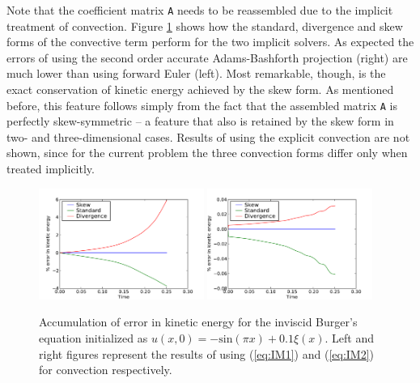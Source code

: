 Note that the coefficient matrix {\fontsize{12pt}{12pt}\texttt{A}} needs to be reassembled due to the
implicit treatment of convection. Figure \ref{fig:burgers_KE} shows
how the standard, divergence and skew forms of the convective term
perform for the two implicit solvers. As expected the errors of using
the second order accurate Adams-Bashforth projection (right) are much
lower than using forward Euler (left). Most remarkable, though, is the
exact conservation of kinetic energy achieved by the skew form. As
mentioned before, this feature follows simply from the fact that
the assembled matrix {\fontsize{12pt}{12pt}\texttt{A}} is perfectly skew-symmetric -- a feature
that also is retained by the skew form in two- and three-dimensional
cases. Results of using the explicit convection are not shown, since
for the current problem the three convection forms differ only when
treated implicitly.

\begin{figure}
 \includegraphics[width=0.48\textwidth]{chapters/mortensen/pdf/Burgers_KE_IM1.pdf}
 \includegraphics[width=0.48\textwidth]{chapters/mortensen/pdf/Burgers_KE_IM2.pdf}
 \caption{
Accumulation of error in kinetic energy for the inviscid Burger's equation initialized as $u(x,0)=-\text{sin}(\pi x)+0.1 \xi(x)$. Left and right figures represent the results of using (\ref{eq:IM1}) and (\ref{eq:IM2}) for convection respectively.
}
\label{fig:burgers_KE}
\end{figure}

